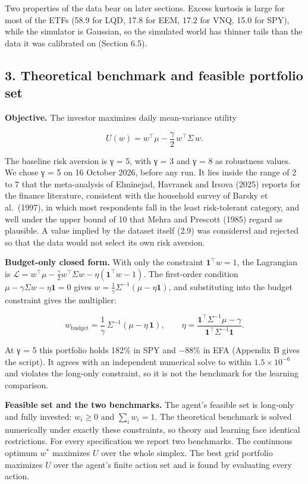\documentclass[
  11pt]{article}
\begin{document}
Two properties of the data bear on later sections. Excess kurtosis is
large for most of the ETFs (58.9 for LQD, 17.8 for EEM, 17.2 for VNQ,
15.0 for SPY), while the simulator is Gaussian, so the simulated world
has thinner tails than the data it was calibrated on (Section 6.5).

\subsection{3. Theoretical benchmark and feasible portfolio
set}\label{theoretical-benchmark-and-feasible-portfolio-set}

\textbf{Objective.} The investor maximizes daily mean-variance utility

\[U(w) = w^\top \mu - \frac{\gamma}{2}\, w^\top \Sigma\, w .\]

The baseline risk aversion is γ = 5, with γ = 3 and γ = 8 as robustness
values. We chose γ = 5 on 16 October 2026, before any run. It lies
inside the range of 2 to 7 that the meta-analysis of Elminejad, Havranek
and Irsova (2025) reports for the finance literature, consistent with
the household survey of Barsky et al.~(1997), in which most respondents
fall in the least risk-tolerant category, and well under the upper bound
of 10 that Mehra and Prescott (1985) regard as plausible. A value
implied by the dataset itself (2.9) was considered and rejected so that
the data would not select its own risk aversion.

\textbf{Budget-only closed form.} With only the constraint
\(\mathbf{1}^\top w = 1\), the Lagrangian is
\(\mathcal{L} = w^\top\mu - \tfrac{\gamma}{2} w^\top \Sigma w - \eta(\mathbf{1}^\top w - 1)\).
The first-order condition
\(\mu - \gamma \Sigma w - \eta \mathbf{1} = 0\) gives
\(w = \tfrac{1}{\gamma}\Sigma^{-1}(\mu - \eta \mathbf{1})\), and
substituting into the budget constraint gives the multiplier:

\[w_{\text{budget}} = \frac{1}{\gamma}\,\Sigma^{-1}\left(\mu - \eta\,\mathbf{1}\right), \qquad \eta = \frac{\mathbf{1}^\top \Sigma^{-1}\mu - \gamma}{\mathbf{1}^\top \Sigma^{-1}\mathbf{1}} .\]

At γ = 5 this portfolio holds 182\% in SPY and −88\% in EFA (Appendix B
gives the script). It agrees with an independent numerical solve to
within \(1.5 \times 10^{-6}\) and violates the long-only constraint, so
it is not the benchmark for the learning comparison.

\textbf{Feasible set and the two benchmarks.} The agent's feasible set
is long-only and fully invested: \(w_i \ge 0\) and \(\sum_i w_i = 1\).
The theoretical benchmark is solved numerically under exactly these
constraints, so theory and learning face identical restrictions. For
every specification we report two benchmarks. The continuous optimum
\(w^*\) maximizes \(U\) over the whole simplex. The best grid portfolio
maximizes \(U\) over the agent's finite action set and is found by
evaluating every action.
\end{document}
